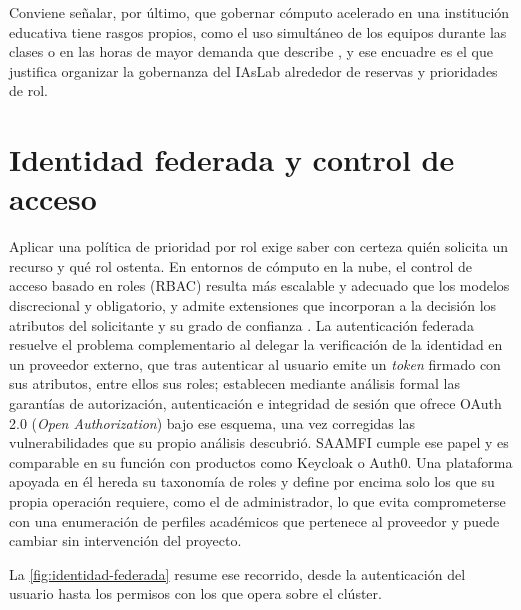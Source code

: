 Conviene señalar, por último, que gobernar cómputo acelerado en una institución educativa tiene rasgos propios, como el uso simultáneo de los equipos durante las clases o en las horas de mayor demanda que describe \citet{george-hpcgpuclassroom-2020}, y ese encuadre es el que justifica organizar la gobernanza del IAsLab alrededor de reservas y prioridades de rol.

\section{Identidad federada y control de acceso}\label{sec:identidad-rbac}

Aplicar una política de prioridad por rol exige saber con certeza quién solicita un recurso y qué rol ostenta. En entornos de cómputo en la nube, el control de acceso basado en roles (RBAC) resulta más escalable y adecuado que los modelos discrecional y obligatorio, y admite extensiones que incorporan a la decisión los atributos del solicitante y su grado de confianza \citep{li-rbaccloudsurvey-2015}. La autenticación federada resuelve el problema complementario al delegar la verificación de la identidad en un proveedor externo, que tras autenticar al usuario emite un \emph{token} firmado con sus atributos, entre ellos sus roles; \citet{fett-oauth2security-2016} establecen mediante análisis formal las garantías de autorización, autenticación e integridad de sesión que ofrece OAuth 2.0 (\emph{Open Authorization}) bajo ese esquema, una vez corregidas las vulnerabilidades que su propio análisis descubrió. SAAMFI cumple ese papel y es comparable en su función con productos como Keycloak o Auth0. Una plataforma apoyada en él hereda su taxonomía de roles y define por encima solo los que su propia operación requiere, como el de administrador, lo que evita comprometerse con una enumeración de perfiles académicos que pertenece al proveedor y puede cambiar sin intervención del proyecto.

La \cref{fig:identidad-federada} resume ese recorrido, desde la autenticación del usuario hasta los permisos con los que opera sobre el clúster.

